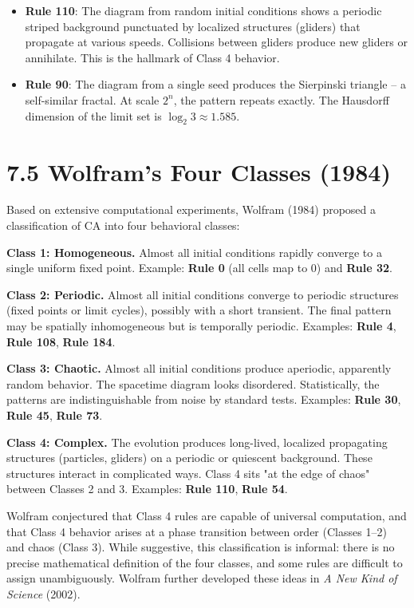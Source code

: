 \begin{itemize}
  \item \textbf{Rule 110}: The diagram from random initial conditions shows a periodic striped background punctuated by localized structures (gliders) that propagate at various speeds. Collisions between gliders produce new gliders or annihilate. This is the hallmark of Class 4 behavior.
\end{itemize}

\begin{itemize}
  \item \textbf{Rule 90}: The diagram from a single seed produces the Sierpinski triangle -- a self-similar fractal. At scale $2^n$, the pattern repeats exactly. The Hausdorff dimension of the limit set is $\log_2 3 \approx 1.585$.
\end{itemize}


\section{7.5 Wolfram's Four Classes (1984)}

Based on extensive computational experiments, Wolfram (1984) proposed a classification of CA into four behavioral classes:

\textbf{Class 1: Homogeneous.} Almost all initial conditions rapidly converge to a single uniform fixed point. Example: \textbf{Rule 0} (all cells map to 0) and \textbf{Rule 32}.

\textbf{Class 2: Periodic.} Almost all initial conditions converge to periodic structures (fixed points or limit cycles), possibly with a short transient. The final pattern may be spatially inhomogeneous but is temporally periodic. Examples: \textbf{Rule 4}, \textbf{Rule 108}, \textbf{Rule 184}.

\textbf{Class 3: Chaotic.} Almost all initial conditions produce aperiodic, apparently random behavior. The spacetime diagram looks disordered. Statistically, the patterns are indistinguishable from noise by standard tests. Examples: \textbf{Rule 30}, \textbf{Rule 45}, \textbf{Rule 73}.

\textbf{Class 4: Complex.} The evolution produces long-lived, localized propagating structures (particles, gliders) on a periodic or quiescent background. These structures interact in complicated ways. Class 4 sits "at the edge of chaos" between Classes 2 and 3. Examples: \textbf{Rule 110}, \textbf{Rule 54}.

Wolfram conjectured that Class 4 rules are capable of universal computation, and that Class 4 behavior arises at a phase transition between order (Classes 1--2) and chaos (Class 3). While suggestive, this classification is informal: there is no precise mathematical definition of the four classes, and some rules are difficult to assign unambiguously. Wolfram further developed these ideas in \textit{A New Kind of Science} (2002).


